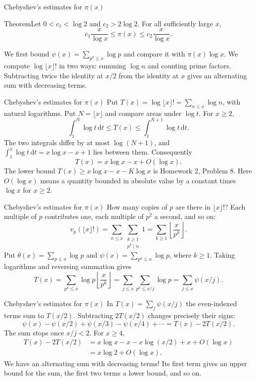 \documentclass[aspectratio=169,11pt]{beamer}
\newcommand{\dd}{\,\mathrm d}
\begin{document}
\begin{frame}{Chebyshev's estimates for $\pi(x)$}
\begin{block}{Theorem}Let $0<c_1<\log2$ and $c_2>2\log2$. For all sufficiently large $x$,
\[c_1\frac{x}{\log x}\le\pi(x)\le c_2\frac{x}{\log x}.\]
\end{block}
We first bound $\psi(x)=\sum_{p^k\le x}\log p$ and compare it with $\pi(x)\log x$. We compute $\log\lfloor x\rfloor!$ in two ways: summing $\log n$ and counting prime factors. Subtracting twice the identity at $x/2$ from the identity at $x$ gives an alternating sum with decreasing terms.
\end{frame}
\begin{frame}{Chebyshev's estimates for $\pi(x)$}
Put $T(x)=\log\lfloor x\rfloor!=\sum_{n\le x}\log n$, with natural logarithms. Put $N=\lfloor x\rfloor$ and compare areas under $\log t$. For $x\ge2$,
\[\int_1^N\log t\dd t\le T(x)\le\int_1^{N+1}\log t\dd t.\]
The two integrals differ by at most $\log(N+1)$, and $\int_1^x\log t\dd t=x\log x-x+1$ lies between them. Consequently
\[T(x)=x\log x-x+O(\log x).\]
The lower bound $T(x)\ge x\log x-x-K\log x$ is Homework 2, Problem 8. Here $O(\log x)$ means a quantity bounded in absolute value by a constant times $\log x$ for $x\ge2$.
\end{frame}
\begin{frame}{Chebyshev's estimates for $\pi(x)$}
How many copies of $p$ are there in $\lfloor x\rfloor!$? Each multiple of $p$ contributes one, each multiple of $p^2$ a second, and so on:
\[v_p(\lfloor x\rfloor!)=\sum_{n\le x}\sum_{\substack{k\ge1\\p^k\mid n}}1=\sum_{k\ge1}\left\lfloor\frac{x}{p^k}\right\rfloor.\]
Put $\theta(x)=\sum_{p\le x}\log p$ and $\psi(x)=\sum_{p^k\le x}\log p$, where $k\ge1$. Taking logarithms and reversing summation gives
\[T(x)=\sum_{p^k\le x}\log p\left\lfloor\frac{x}{p^k}\right\rfloor=\sum_{j\le x}\sum_{p^k\le x/j}\log p=\sum_{j\le x}\psi(x/j).\]
\end{frame}
\begin{frame}{Chebyshev's estimates for $\pi(x)$}
In $T(x)=\sum_j\psi(x/j)$ the even-indexed terms sum to $T(x/2)$. Subtracting $2T(x/2)$ changes precisely their signs:
\[\psi(x)-\psi(x/2)+\psi(x/3)-\psi(x/4)+\cdots=T(x)-2T(x/2).\]
The sum stops once $x/j<2$. For $x\ge4$,
\begin{align*}
T(x)-2T(x/2)&=x\log x-x-x\log(x/2)+x+O(\log x)\\
&=x\log2+O(\log x).
\end{align*}
We have an alternating sum with decreasing terms! Its first term gives an upper bound for the sum, the first two terms a lower bound, and so on.
\end{frame}
\end{document}
